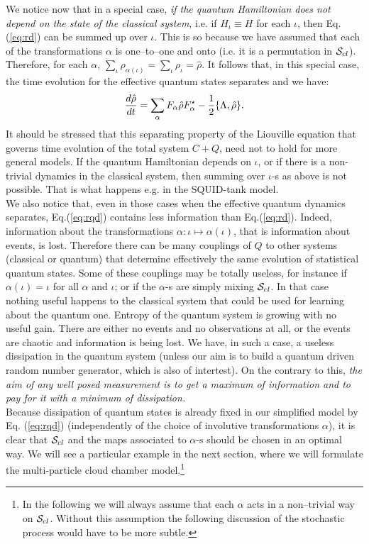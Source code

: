 \documentclass[12pt]{article}
\def\rh{{\hat\rho}}
\def\cs{{\cal S}_{cl}}
\def\be{\begin{equation}}
\def\ee{\end{equation}}
\begin{document}
We notice now that in a special case, {\sl if the quantum Hamiltonian does
not depend on
the state of the classical system}, i.e. if $H_\iota\equiv H$ for
each $\iota$, then Eq. (\ref{eq:rd}) can be summed up over
$\iota$. This is so because we have assumed that each of the
transformations $\alpha$ is one--to--one and onto (i.e. it is a
permutation in $\cs$). Therefore, for each $\alpha$,
$\sum_\iota\rho_{\alpha(\iota)}=\sum_\iota \rho_\iota=\rh$. It follows
that, in this special case, the time evolution for the effective quantum
states separates and we have:
\be {d{\rh}\over {dt}}=\sum_\alpha F_\alpha\rh
F_\alpha^{\star}-{1\over2}\{\Lambda,\rh\}.
\label{eq:rqd}
\ee
It should be stressed that this separating property of the Liouville
equation that governs time evolution of the total system $C+Q$, need not
to hold for more general models. If the quantum Hamiltonian depends on
$\iota$, or if there is a non-trivial dynamics in the classical system,
then summing over $\iota$-s as above is not possible. That is what
happens e.g. in the SQUID-tank model.\\
We also notice that, even in those cases when the effective quantum
dynamics separates,  Eq.(\ref{eq:rqd}) contains less information than
Eq.(\ref{eq:rd}). Indeed, information about the transformations
$\alpha:\iota\mapsto\alpha(\iota)$, that is information about events, is
lost. Therefore there can be many couplings of $Q$ to other systems
(classical or quantum) that determine effectively the same evolution of
statistical quantum states. Some of these couplings may be totally
useless, for instance if $\alpha(\iota)=\iota$ for all $\alpha$ and
$\iota$; or if the $\alpha$-s are simply mixing $\cs$. In that case
nothing useful happens to the classical system that could be used for
learning about the quantum one. Entropy of the quantum system is growing
with no useful gain. There are either no events and no observations at
all, or the events are chaotic and information is being lost. We have,
in such a case, a useless dissipation in the quantum system (unless our
aim is to build a quantum driven random number generator, which is also
of intertest). On the
contrary to this, {\sl the aim of any well posed measurement is to get a
maximum of information and to pay for it with a minimum of
dissipation.}\\
Because dissipation of quantum states is already fixed in our simplified
model by Eq. (\ref{eq:rqd}) (independently of the choice of involutive
transformations $\alpha$), it is clear that $\cs$ and the maps
associated to $\alpha$-s should be chosen in an optimal way. We will see
a particular example in the next section, where we will formulate the
multi-particle cloud chamber model.\footnote{In the following we will
always assume that each $\alpha$ acts in a non--trivial way on $\cs$.
Without this assumption the following discussion of the stochastic
process would have to be more subtle.}
\end{document}
